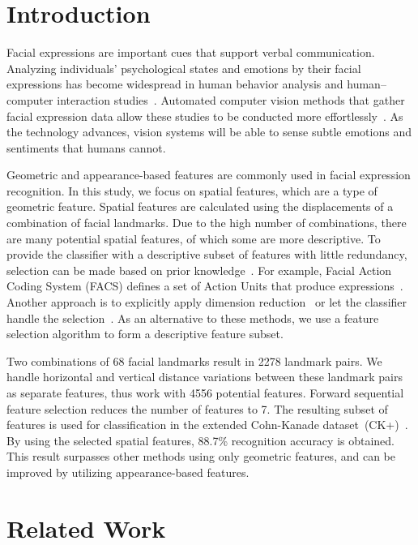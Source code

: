 \documentclass[hyperfootnotes=false]{article}
\begin{document}
\section{Introduction}
\label{sec:intro}

Facial expressions are important cues that support verbal communication.
Analyzing individuals' psychological states and emotions by their facial expressions has become widespread in human behavior analysis and human--computer interaction studies~\cite{Ekman:1997,Bartlett:2003}.
Automated computer vision methods that gather facial expression data allow these studies to be conducted more effortlessly~\cite{Zeng:2009,Rehg:2013}.
As the technology advances, vision systems will be able to sense subtle emotions and sentiments that humans cannot.

Geometric and appearance-based features are commonly used in facial expression recognition.
In this study, we focus on spatial features, which are a type of geometric feature.
Spatial features are calculated using the displacements of a combination of facial landmarks.
Due to the high number of combinations, there are many potential spatial features, of which some are more descriptive.
To provide the classifier with a descriptive subset of features with little redundancy, selection can be made based on prior knowledge~\cite{Tian:2001,Suk:2014}.
For example, Facial Action Coding System (FACS) defines a set of Action Units that produce expressions~\cite{Ekman:1997}.
Another approach is to explicitly apply dimension reduction~\cite{Huang:2014,Ekenel:2004} or let the classifier handle the selection~\cite{Chen:2015}.
As an alternative to these methods, we use a feature selection algorithm to form a descriptive feature subset.

Two combinations of 68 facial landmarks result in 2278 landmark pairs.
We handle horizontal and vertical distance variations between these landmark pairs as separate features, thus work with 4556 potential features.
Forward sequential feature selection reduces the number of features to 7.
The resulting subset of features is used for classification in the extended Cohn-Kanade dataset~(CK+)~\cite{Lucey:2010}.
By using the selected spatial features, 88.7\% recognition accuracy is obtained.
This result surpasses other methods using only geometric features, and can be improved by utilizing appearance-based features.

\section{Related Work}
\end{document}
